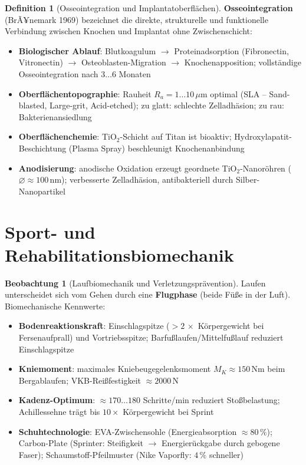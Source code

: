 ﻿\documentclass[a4paper,12pt]{report}
\theoremstyle{definition}
\newtheorem{definition}{Definition}
\newtheorem{beobachtung}{Beobachtung}
\begin{document}
\begin{definition}[Osseointegration und Implantatoberflächen]
\textbf{Osseointegration} (BrÃ¥nemark 1969) bezeichnet die direkte,
strukturelle und funktionelle Verbindung zwischen Knochen und Implantat
ohne Zwischenschicht:
\begin{itemize}
    \item[-] \textbf{Biologischer Ablauf}: Blutkoagulum $\to$ Proteinadsorption
          (Fibronectin, Vitronectin) $\to$ Osteoblasten-Migration $\to$
          Knochenapposition; vollständige Osseointegration nach $3\ldots6$ Monaten
    \item[-] \textbf{Oberflächentopographie}: Rauheit $R_a = 1\ldots10\,\mu\mathrm{m}$
          optimal (SLA -- Sand-blasted, Large-grit, Acid-etched);
          zu glatt: schlechte Zelladhäsion; zu rau: Bakterienansiedlung
    \item[-] \textbf{Oberflächenchemie}: TiO$_2$-Schicht auf Titan ist bioaktiv;
          Hydroxylapatit-Beschichtung (Plasma Spray) beschleunigt Knochenanbindung
    \item[-] \textbf{Anodisierung}: anodische Oxidation erzeugt geordnete
          TiO$_2$-Nanoröhren ($\varnothing \approx 100\,\mathrm{nm}$);
          verbesserte Zelladhäsion, antibakteriell durch Silber-Nanopartikel
\end{itemize}
\end{definition}

\section{Sport- und Rehabilitationsbiomechanik}

\begin{beobachtung}[Laufbiomechanik und Verletzungsprävention]
Laufen unterscheidet sich vom Gehen durch eine \textbf{Flugphase}
(beide Füße in der Luft). Biomechanische Kennwerte:
\begin{itemize}
    \item[-] \textbf{Bodenreaktionskraft}: Einschlagspitze ($> 2\,\times$ Körpergewicht bei Fersenaufprall)
          und Vortriebsspitze; Barfußlaufen/Mittelfußlauf reduziert Einschlagspitze
    \item[-] \textbf{Kniemoment}: maximales Kniebeugegelenksmoment
          $M_K \approx 150\,\mathrm{Nm}$ beim Bergablaufen; VKB-Reißfestigkeit $\approx 2000\,\mathrm{N}$
    \item[-] \textbf{Kadenz-Optimum}: $\approx 170\ldots180$ Schritte/min reduziert
          Stoßbelastung; Achillessehne trägt bis $10\times$ Körpergewicht bei Sprint
    \item[-] \textbf{Schuhtechnologie}: EVA-Zwischensohle (Energieabsorption $\approx 80\,\%$);
          Carbon-Plate (Sprinter: Steifigkeit $\to$ Energierückgabe durch gebogene Faser);
          Schaumstoff-Pfeilmuster (Nike Vaporfly: $4\,\%$ schneller)
\end{itemize}
\end{beobachtung}
\end{document}
